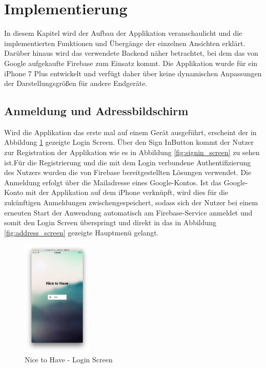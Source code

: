 \section{Implementierung}


In diesem Kapitel wird der Aufbau der Applikation veranschaulicht und die implementierten Funktionen und Übergänge der einzelnen Ansichten erklärt. Darüber hinaus wird das verwendete Backend näher betrachtet, bei dem das von Google aufgekaufte Firebase zum Einsatz kommt.
Die Applikation wurde für ein iPhone 7 Plus entwickelt und verfügt daher über keine dynamischen Anpassungen der Darstellungsgrößen für andere Endgeräte.   


\subsection{Anmeldung und Adressbildschirm}
Wird die Applikation das erste mal auf einem Gerät ausgeführt, erscheint der in Abbildung \ref{fig:login_screen} gezeigte \glqq Login Screen\grqq{}. Über den \glqq Sign In\grqq{ }Button kommt der Nutzer zur Registration der Applikation wie es in Abbildung \ref{fig:signin_screen} zu sehen ist.Für die Registrierung und die mit dem Login verbundene Authentifizierung des Nutzers wurden die von Firebase bereitgestellten Lösungen verwendet. Die Anmeldung erfolgt über die Mailadresse eines Google-Kontos.
\newline
Ist das Google-Konto mit der Applikation auf dem iPhone verknüpft, wird dies für die zukünftigen Anmeldungen zwischengespeichert, sodass sich der Nutzer bei einem erneuten Start der Anwendung automatisch am Firebase-Service anmeldet und somit den Login Screen überspringt und direkt in das in Abbildung \ref{fig:address_screen} gezeigte Hauptmenü gelangt.
\begin{figure}[ht]
  \centering
    \includegraphics[width=0.3\textwidth]{images/login_screen}
    \caption{Nice to Have - Login Screen}
	 \label{fig:login_screen}
\end{figure}
